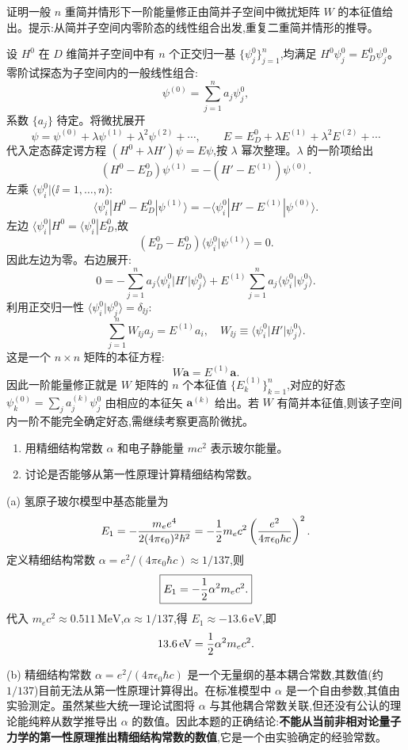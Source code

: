 \begin{question}
证明一般 $n$ 重简并情形下一阶能量修正由简并子空间中微扰矩阵 $W$ 的本征值给出。提示:从简并子空间内零阶态的线性组合出发,重复二重简并情形的推导。
\begin{solution}
设 $H^0$ 在 $D$ 维简并子空间中有 $n$ 个正交归一基 $\{\psi_j^0\}_{j=1}^n$,均满足 $H^0\psi_j^0=E_D^0\psi_j^0$。零阶试探态为子空间内的一般线性组合:
\[
\psi^{(0)}=\sum_{j=1}^n a_j\psi_j^0,
\]
系数 $\{a_j\}$ 待定。将微扰展开
\[
\psi=\psi^{(0)}+\lambda\psi^{(1)}+\lambda^2\psi^{(2)}+\cdots,\qquad
E=E_D^0+\lambda E^{(1)}+\lambda^2 E^{(2)}+\cdots
\]
代入定态薛定谔方程 $(H^0+\lambda H')\psi=E\psi$,按 $\lambda$ 幂次整理。$\lambda$ 的一阶项给出
\[
(H^0-E_D^0)\psi^{(1)}=-(H'-E^{(1)})\psi^{(0)}.
\]
左乘 $\langle\psi_i^0|$($\ii=1,\dots,n$):
\[
\langle\psi_i^0|H^0-E_D^0|\psi^{(1)}\rangle
=-\langle\psi_i^0|H'-E^{(1)}|\psi^{(0)}\rangle.
\]
左边 $\langle\psi_i^0|H^0=\langle\psi_i^0|E_D^0$,故
\[
(E_D^0-E_D^0)\langle\psi_i^0|\psi^{(1)}\rangle=0.
\]
因此左边为零。右边展开:
\[
0=-\sum_{j=1}^n a_j\langle\psi_i^0|H'|\psi_j^0\rangle
+E^{(1)}\sum_{j=1}^n a_j\langle\psi_i^0|\psi_j^0\rangle.
\]
利用正交归一性 $\langle\psi_i^0|\psi_j^0\rangle=\delta_{\ii j}$:
\[
\sum_{j=1}^n W_{\ii j}a_j = E^{(1)}a_i,\quad
W_{\ii j}\equiv\langle\psi_i^0|H'|\psi_j^0\rangle.
\]
这是一个 $n\times n$ 矩阵的本征方程:
\[
W\mathbf a = E^{(1)}\mathbf a.
\]
因此一阶能量修正就是 $W$ 矩阵的 $n$ 个本征值 $\{E_k^{(1)}\}_{k=1}^n$,对应的好态 $\psi_k^{(0)}=\sum_j a_j^{(k)}\psi_j^0$ 由相应的本征矢 $\mathbf a^{(k)}$ 给出。若 $W$ 有简并本征值,则该子空间内一阶不能完全确定好态,需继续考察更高阶微扰。
\end{solution}
\end{question}

\begin{question}
\begin{enumerate}
\item 用精细结构常数 $\alpha$ 和电子静能量 $mc^2$ 表示玻尔能量。
\item 讨论是否能够从第一性原理计算精细结构常数。
\end{enumerate}
\begin{solution}
(a) 氢原子玻尔模型中基态能量为
\[
E_1=-{m_ee^4\over2(4\pi\epsilon_0)^2\hbar^2}
=-{1\over2}m_ec^2\left({e^2\over4\pi\epsilon_0\hbar c}\right)^2.
\]
定义精细结构常数 $\alpha=e^2/(4\pi\epsilon_0\hbar c)\approx1/137$,则
\[
\boxed{E_1=-{1\over2}\alpha^2 m_ec^2.}
\]
代入 $m_ec^2\approx0.511\,\mathrm{MeV}$,$\alpha\approx1/137$,得 $E_1\approx-13.6\,\mathrm{eV}$,即
\[
13.6\,\mathrm{eV}={1\over2}\alpha^2m_ec^2.
\]

(b) 精细结构常数 $\alpha=e^2/(4\pi\epsilon_0\hbar c)$ 是一个无量纲的基本耦合常数,其数值(约 $1/137$)目前无法从第一性原理计算得出。在标准模型中 $\alpha$ 是一个自由参数,其值由实验测定。虽然某些大统一理论试图将 $\alpha$ 与其他耦合常数关联,但还没有公认的理论能纯粹从数学推导出 $\alpha$ 的数值。因此本题的正确结论:\textbf{不能从当前非相对论量子力学的第一性原理推出精细结构常数的数值},它是一个由实验确定的经验常数。
\end{solution}
\end{question}


